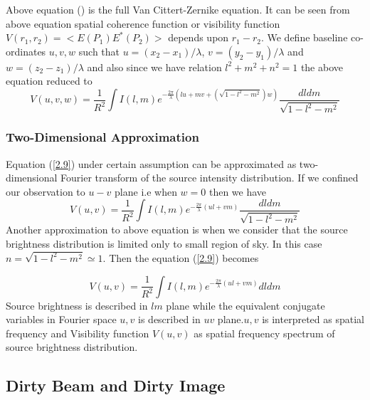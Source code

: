 Above equation () is the full Van Cittert-Zernike equation. It can be seen from above equation spatial coherence function or
visibility function $V(r_1,r_2)=< E(P_1)E^*(P_2)>$ depends upon $r_1-r_2$. We define baseline co-ordinates $u,v,w$ such that 
$u = (x_2-x_1)/\lambda$, $v = (y_2-y_1)/\lambda$ and $w = (z_2-z_1)/\lambda$ and also since we have relation $l^2+m^2+n^2=1$
the above equation reduced to
\begin{equation}
V(u,v,w) = \frac{1}{R^2}\int I(l,m) e^{-\frac{2\pi}{\lambda}(lu+mv+(\sqrt{1-l^2-m^2})w)} \frac{dldm}{\sqrt{1-l^2-m^2}} 
\label{2.9}
\end{equation}

\subsubsection{Two-Dimensional Approximation}

Equation (\ref{2.9}) under certain assumption can be approximated as two-dimensional Fourier transform of the source intensity
distribution. If we confined our observation to $u-v$ plane i.e when $w=0$ then we have 
\begin{equation}
V(u,v) = \frac{1}{R^2}\int I(l,m) e^{-\frac{2\pi}{\lambda}(ul+vm)} \frac{dldm}{\sqrt{1-l^2-m^2}} 
\label{2.10}
\end{equation}
Another approximation to above equation is when we consider that the source brightness distribution is limited only
to small region of sky. In this case $n =\sqrt{1-l^2-m^2} \simeq 1$. Then the equation (\ref{2.9}) becomes

\begin{equation}
V(u,v) = \frac{1}{R^2}\int I(l,m) e^{-\frac{2\pi}{\lambda}(ul+vm)} dldm
\label{2.11}
\end{equation}
Source brightness is described in $lm$ plane while the equivalent conjugate variables in Fourier space $u,v$ is
described in $uv$ plane.$u,v$ is interpreted as spatial frequency and Visibility function $V(u,v)$ as spatial
frequency spectrum of source brightness distribution. 


\subsection{Dirty Beam and Dirty Image}
\label{s:radio_dirty}

